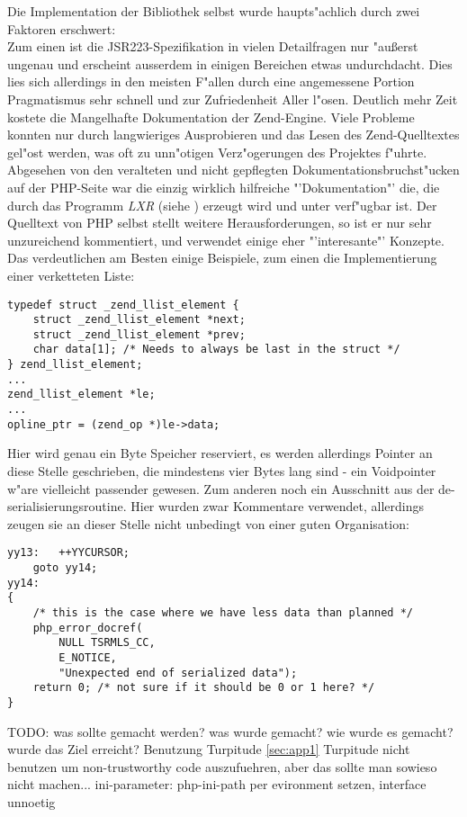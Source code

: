 Die Implementation der Bibliothek selbst wurde haupts"achlich durch zwei Faktoren erschwert:\\
Zum einen ist die JSR223-Spezifikation in vielen Detailfragen nur "au\ss erst ungenau und erscheint ausserdem
in einigen Bereichen etwas undurchdacht. Dies lies sich allerdings in den meisten F"allen durch eine
angemessene Portion Pragmatismus sehr schnell und zur Zufriedenheit Aller l"osen. Deutlich mehr Zeit
kostete die Mangelhafte Dokumentation der Zend-Engine. Viele Probleme konnten nur durch langwieriges
Ausprobieren und das Lesen des Zend-Quelltextes gel"ost werden, was oft zu unn"otigen Verz"ogerungen 
des Projektes f"uhrte. Abgesehen von den veralteten und nicht gepflegten Dokumentationsbruchst"ucken
auf der PHP-Seite \cite{PHPHP} war die einzig wirklich hilfreiche "'Dokumentation"' die, die durch das Programm
\emph{LXR} (siehe \cite{LXRHP}) erzeugt wird und unter \cite{PHPLXR} verf"ugbar ist. Der Quelltext
von PHP selbst stellt weitere Herausforderungen, so ist er nur sehr unzureichend kommentiert, und verwendet
einige eher "'interesante"' Konzepte. Das verdeutlichen am Besten einige Beispiele, zum einen die 
Implementierung einer verketteten Liste:
\begin{lstlisting}[caption=Verkettete Liste im Zend-Code]
typedef struct _zend_llist_element {
    struct _zend_llist_element *next;
    struct _zend_llist_element *prev;
    char data[1]; /* Needs to always be last in the struct */
} zend_llist_element;
...
zend_llist_element *le;
...
opline_ptr = (zend_op *)le->data;
\end{lstlisting}
Hier wird genau ein Byte Speicher reserviert, es werden allerdings Pointer an diese Stelle geschrieben,
die mindestens vier Bytes lang sind - ein Voidpointer w"are vielleicht passender gewesen.
Zum anderen noch ein Ausschnitt aus der de-serialisierungsroutine. Hier wurden zwar Kommentare
verwendet, allerdings zeugen sie an dieser Stelle nicht unbedingt von einer guten Organisation:
\begin{lstlisting}[caption=lustiges Beispiel f"ur Zend-Code]
yy13:   ++YYCURSOR;
    goto yy14;
yy14:
{
    /* this is the case where we have less data than planned */
    php_error_docref(
        NULL TSRMLS_CC, 
        E_NOTICE, 
        "Unexpected end of serialized data");
    return 0; /* not sure if it should be 0 or 1 here? */
}
\end{lstlisting}


TODO:
was sollte gemacht werden? was wurde gemacht? wie wurde es gemacht?
wurde das Ziel erreicht?
Benutzung Turpitude \ref{sec:app1}
Turpitude nicht benutzen um non-trustworthy code auszufuehren, aber das sollte man
sowieso nicht machen...
ini-parameter: php-ini-path per evironment setzen, interface unnoetig

